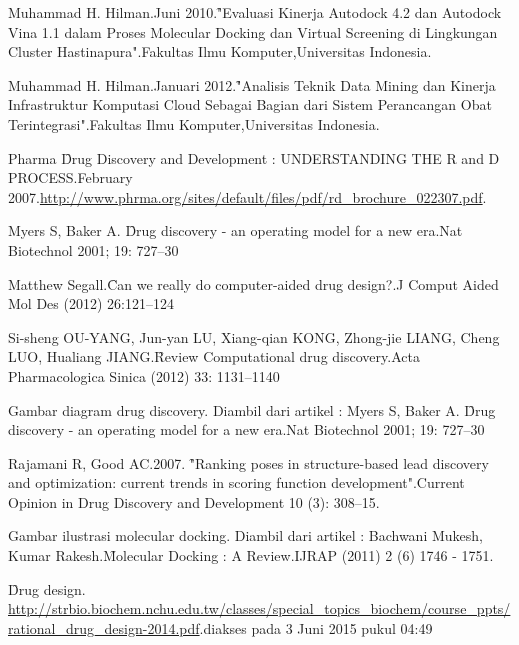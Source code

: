 %
% 

% 
% 
\begin{thebibliography}{4}

{Muhammad H. Hilman.Juni 2010.\f{"Evaluasi Kinerja Autodock 4.2 dan Autodock Vina 1.1 dalam Proses Molecular Docking dan Virtual Screening di Lingkungan Cluster Hastinapura"}.Fakultas Ilmu Komputer,Universitas Indonesia.}

{Muhammad H. Hilman.Januari 2012.\f{"Analisis Teknik Data Mining dan Kinerja
		Infrastruktur Komputasi Cloud Sebagai Bagian dari
		Sistem Perancangan Obat Terintegrasi"}.Fakultas Ilmu Komputer,Universitas Indonesia.}

{Pharma \f{Drug Discovery and Development : UNDERSTANDING THE R and D PROCESS}.February 2007.\url{http://www.phrma.org/sites/default/files/pdf/rd_brochure_022307.pdf}.}

{Myers S, Baker A. \f{Drug discovery - an operating model for a new era}.Nat Biotechnol 2001; 19: 727–30}

{Matthew Segall.\f{Can we really do computer-aided drug design?}.J Comput Aided Mol Des (2012) 26:121–124}

{Si-sheng OU-YANG, Jun-yan LU, Xiang-qian KONG, Zhong-jie LIANG, Cheng LUO, Hualiang JIANG.\f{Review Computational drug discovery}.Acta Pharmacologica Sinica (2012) 33: 1131–1140}

{Gambar diagram drug discovery. Diambil dari artikel : Myers S, Baker A. \f{Drug discovery - an operating model for a new era}.Nat Biotechnol 2001; 19: 727–30 }

{Rajamani R, Good AC.2007. \f{"Ranking poses in structure-based lead discovery and optimization: current trends in scoring function development"}.Current Opinion in Drug Discovery and Development 10 (3): 308–15.}

{Gambar ilustrasi molecular docking. Diambil dari artikel : Bachwani Mukesh, Kumar Rakesh.\f{Molecular Docking : A Review}.IJRAP (2011) 2 (6) 1746 - 1751.}

{\f{Drug design}. \url{http://strbio.biochem.nchu.edu.tw/classes/special_topics_biochem/course_ppts/rational_drug_design-2014.pdf}.diakses pada 3 Juni 2015 pukul 04:49}


\end{thebibliography}
